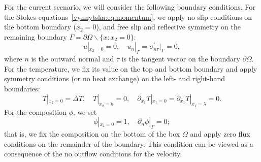 For the current scenario, we will consider the following boundary
conditions. For the Stokes equations~\eqref{vynnytska:eq:momentum}, we
apply no slip conditions on the bottom boundary ($x_2 = 0$), and free
slip and reflective symmetry on the remaining boundary $\Gamma
= \partial \Omega \backslash \{x: x_2 = 0 \}$:
\begin{equation}
  \label{vynnytska:eq:bcs}
  u |_{x_2 = 0} = 0, \quad
  u_n|_{\Gamma}  =  \sigma^{\prime}_{n \tau} |_{\Gamma} = 0,
\end{equation}
where $n$ is the outward normal and $\tau$ is the tangent vector on
the boundary $\partial \Omega$. For the temperature, we fix its value
on the top and bottom boundary and apply symmetry conditions (or no
heat exchange) on the left- and right-hand boundaries:
\begin{equation}
  T |_{x_2 = 0} = \Delta T, \quad T |_{x_2 = h}  = 0, \quad
  \partial_{x_1} T |_{x_1 = 0}  = \partial_{x_1} T |_{x_1 = \lambda} = 0.
\end{equation}
For the composition $\phi$, we set\vspace*{5pt}
\begin{equation}
  \phi |_{x_2 = 0} = 1, \quad \partial_{n} \phi|_{\Gamma} = 0;
\end{equation}
that is, we fix the composition on the bottom of the box $\Omega$
and apply zero flux conditions on the remainder of the boundary. This
condition can be viewed as a consequence of the no outflow conditions
for the velocity.

